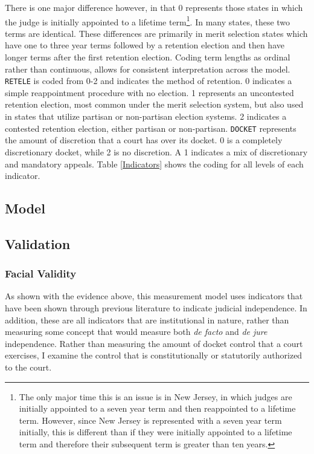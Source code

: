 \documentclass[12pt]{article}
\begin{document}
There is one major difference however, in that 0 represents those states in which the judge is initially appointed to a lifetime term\footnote{The only major time this is an issue is in New Jersey, in which judges are initially appointed to a seven year term and then reappointed to a lifetime term.  However, since New Jersey is represented with a seven year term initially, this is different than if they were initially appointed to a lifetime term and therefore their subsequent term is greater than ten years.}.  In many states, these two terms are identical.  These differences are primarily in merit selection states which have one to three year terms followed by a retention election and then have longer terms after the first retention election.  Coding term lengths as ordinal rather than continuous, allows for consistent interpretation across the model.  \texttt{RETELE} is coded from 0-2 and indicates the method of retention.  0 indicates a simple reappointment procedure with no election.  1 represents an uncontested retention election, most common under the merit selection system, but also used in states that utilize partisan or non-partisan election systems.  2 indicates a contested retention election, either partisan or non-partisan.  \texttt{DOCKET} represents the amount of discretion that a court has over its docket.  0 is a completely discretionary docket, while 2 is no discretion.  A 1 indicates a mix of discretionary and mandatory appeals. Table \ref{Indicators} shows the coding for all levels of each indicator. 

\subsection*{Model}


\newpage\subsection*{Validation}
\subsubsection*{Facial Validity}
As shown with the evidence above, this measurement model uses indicators that have been shown
through previous literature to indicate judicial independence. In addition, these are all indicators
that are institutional in nature, rather than measuring some concept that would measure both \textit{de
facto} and \textit{de jure} independence. Rather than measuring the amount of docket control that a court
exercises, I examine the control that is constitutionally or statutorily authorized to the court.
\end{document}
